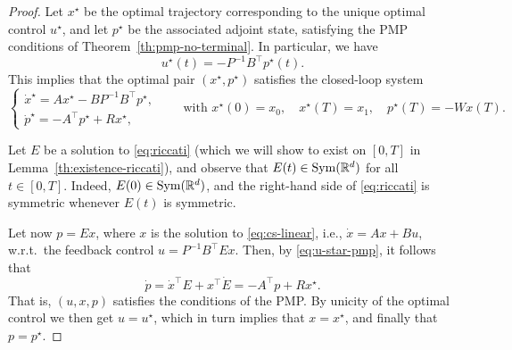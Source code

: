 \begin{proof}
    Let $x^\star$ be the optimal trajectory corresponding to the unique optimal control $u^\star$, and let $p^\star$ be the associated adjoint state, satisfying the PMP conditions of Theorem~\ref{th:pmp-no-terminal}.
    In particular, we have
    \begin{equation}
        \label{eq:u-star-pmp}
        u^\star(t) = -P^{-1} B^\top p^\star(t).
    \end{equation}
    This implies that the optimal pair $(x^\star,p^\star)$ satisfies the closed-loop system
    \begin{equation}
        \begin{cases}
            \dot x^\star = A x^\star - B P^{-1} B^\top p^\star, \\
            \dot p^\star = -A^\top p^\star + R x^\star,
        \end{cases}
        \qquad
        \text{with } x^\star(0)=x_0, \quad x^\star(T)=x_1, \quad p^\star(T)=-Wx(T).
    \end{equation}
    
    Let $E$ be a solution to \eqref{eq:riccati} (which we will show to exist on $[0,T]$ in Lemma~\ref{th:existence-riccati}), and observe that $E(t)\in \operatorname{Sym}(\mathbb{R}^d)$ for all $t\in [0,T]$. 
    Indeed, $E(0)\in \operatorname{Sym}(\mathbb{R}^d)$, and the right-hand side of \eqref{eq:riccati} is symmetric whenever $E(t)$ is symmetric.
    
    Let now $p=E x$, where $x$ is the solution to \eqref{eq:cs-linear}, i.e., $\dot x = Ax+Bu$, w.r.t.~the feedback control $u=P^{-1}B^\top E x$.
    Then, by \eqref{eq:u-star-pmp}, it follows that 
    \begin{equation}
        \dot p = \dot x^\top E + x^\top \dot E 
        = -A^\top p + R x^\star.
    \end{equation}
    That is, $(u, x, p)$ satisfies the conditions of the PMP. By unicity of the optimal control we then get $u=u^\star$, which in turn implies that $x=x^\star$, and  finally that $p=p^\star$.


\end{proof}

